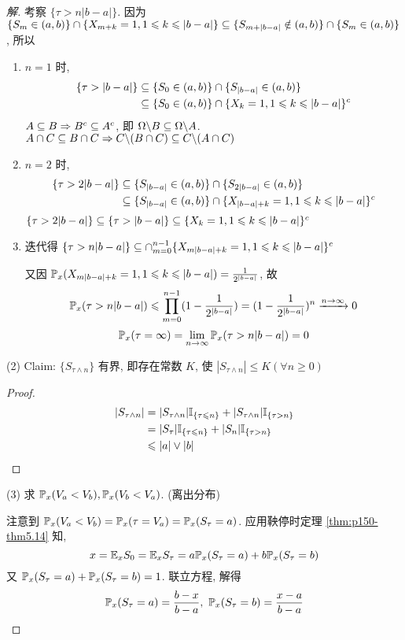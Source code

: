 \begin{proof}[解]
考察 $\{\tau>n|b-a|\}$. 因为 $\{S_m\in (a,b)\}\cap \{X_{m+k}=1,1\leqslant k\leqslant |b-a|\}\subseteq \{S_{m+|b-a|}\notin (a,b)\}\cap \{S_m\in (a,b)\}$, 所以
\begin{enumerate}
    \item $n=1$ 时,
    \[
    \begin{aligned}
        \{\tau>|b-a|\} &\subseteq \{S_0\in (a,b)\} \cap\{S_{|b-a|}\in (a,b)\} \\
        &\subseteq \{S_0\in (a,b)\} \cap \{X_k=1,1\leqslant k\leqslant |b-a|\}^c
    \end{aligned}
    \]
    $A\subseteq B\Rightarrow B^c\subseteq A^c$, 即 $\Omega\backslash B\subseteq \Omega\backslash A$. $A\cap C\subseteq B\cap C\Rightarrow C\backslash (B\cap C)\subseteq C\backslash (A\cap C)$
    \item $n=2$ 时,
    \[
    \begin{aligned}
        \{\tau>2|b-a|\} &\subseteq \{S_{|b-a|}\in (a,b)\}\cap \{S_{2|b-a|}\in (a,b)\}\\
        &\subseteq \{S_{|b-a|}\in (a,b)\} \cap \{X_{|b-a|+k}=1,1\leqslant k\leqslant |b-a|\}^c
    \end{aligned}
    \]
    $\{\tau>2|b-a|\}\subseteq \{\tau>|b-a|\}\subseteq\{X_k=1,1\leqslant k\leqslant |b-a|\}^c$
    \item 迭代得 $\{\tau>n|b-a|\}\subseteq\cap_{m=0}^{n-1}\{X_{m|b-a|+k}=1,1\leqslant k\leqslant |b-a|\}^c$
    
    又因 $\mathbb{P}_x(X_{m|b-a|+k}=1,1\leqslant k\leqslant |b-a|)=\frac{1}{2^{|b-a|}}$, 故
    \[
    \mathbb{P}_x(\tau> n|b-a|)\leqslant\prod_{m=0}^{n-1}(1-\frac{1}{2^{|b-a|}})=(1-\frac{1}{2^{|b-a|}})^n\xrightarrow{n\to\infty}0
    \]
    \[
    \mathbb{P}_x(\tau=\infty)=\lim_{n \to \infty}\mathbb{P}_x(\tau>n|b-a|)=0
    \]
\end{enumerate}

(2) Claim: $\{S_{\tau\land n}\}$ 有界, 即存在常数 $K$, 使 $|S_{\tau\land n}|\leq K (\forall n\geq 0)$
\begin{proof}
    \[
    \begin{aligned}
        |S_{\tau\land n}| &= |S_{\tau\land n}|\mathbb I_{\{\tau\leqslant n\}}+|S_{\tau\land n}|\mathbb I_{\{\tau> n\}}\\
        &=|S_{\tau}|\mathbb I_{\{\tau\leqslant n\}}+|S_n|\mathbb I_{\{\tau> n\}}\\
        &\leqslant |a|\lor |b|
    \end{aligned}
    \]
\end{proof}

(3) 求 $\mathbb{P}_x(V_a<V_b), \mathbb{P}_x(V_b<V_a)$. (离出分布)

注意到 $\mathbb{P}_x(V_a<V_b)=\mathbb{P}_x(\tau=V_a)=\mathbb{P}_x(S_{\tau}=a)$. 应用鞅停时定理 \ref{thm:p150-thm5.14} 知, 
\[
x=\mathbb E_x S_0=\mathbb E_x S_{\tau}=a\mathbb{P}_x(S_{\tau}=a)+b\mathbb{P}_x(S_{\tau}=b)
\]
又 $\mathbb{P}_x(S_{\tau}=a)+\mathbb{P}_x(S_{\tau}=b)=1$. 联立方程, 解得
\[
\PP_x(S_{\tau}=a)=\frac{b-x}{b-a}, \ \PP_x(S_{\tau}=b)=\frac{x-a}{b-a}
\]
\end{proof}

